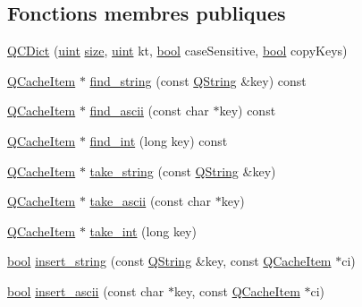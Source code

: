 \subsection*{Fonctions membres publiques}
\begin{DoxyCompactItemize}
\item 
\hyperlink{class_q_c_dict_a03e70e9f1509c03eb1fd08a8af904734}{Q\+C\+Dict} (\hyperlink{qglobal_8h_a4d3943ddea65db7163a58e6c7e8df95a}{uint} \hyperlink{class_q_g_dict_a1306e6fd44670f39bef97380ddadbe14}{size}, \hyperlink{qglobal_8h_a4d3943ddea65db7163a58e6c7e8df95a}{uint} kt, \hyperlink{qglobal_8h_a1062901a7428fdd9c7f180f5e01ea056}{bool} case\+Sensitive, \hyperlink{qglobal_8h_a1062901a7428fdd9c7f180f5e01ea056}{bool} copy\+Keys)
\item 
\hyperlink{struct_q_cache_item}{Q\+Cache\+Item} $\ast$ \hyperlink{class_q_c_dict_a321aef5383ff5e2c693dc99e2e6e430f}{find\+\_\+string} (const \hyperlink{class_q_string}{Q\+String} \&key) const 
\item 
\hyperlink{struct_q_cache_item}{Q\+Cache\+Item} $\ast$ \hyperlink{class_q_c_dict_a8fba04c10aff3eee9e14ee97aa5b0757}{find\+\_\+ascii} (const char $\ast$key) const 
\item 
\hyperlink{struct_q_cache_item}{Q\+Cache\+Item} $\ast$ \hyperlink{class_q_c_dict_a62aabeb819008e33c15a3f245809aa7e}{find\+\_\+int} (long key) const 
\item 
\hyperlink{struct_q_cache_item}{Q\+Cache\+Item} $\ast$ \hyperlink{class_q_c_dict_a7f08231ccc7351ca90acf4342e32217a}{take\+\_\+string} (const \hyperlink{class_q_string}{Q\+String} \&key)
\item 
\hyperlink{struct_q_cache_item}{Q\+Cache\+Item} $\ast$ \hyperlink{class_q_c_dict_a1f44b8f805674630a62ccf643cdec5df}{take\+\_\+ascii} (const char $\ast$key)
\item 
\hyperlink{struct_q_cache_item}{Q\+Cache\+Item} $\ast$ \hyperlink{class_q_c_dict_a320567bbbc800a59bdee4f69a356e942}{take\+\_\+int} (long key)
\item 
\hyperlink{qglobal_8h_a1062901a7428fdd9c7f180f5e01ea056}{bool} \hyperlink{class_q_c_dict_ae367e4d033e0f420364584dc64b1371a}{insert\+\_\+string} (const \hyperlink{class_q_string}{Q\+String} \&key, const \hyperlink{struct_q_cache_item}{Q\+Cache\+Item} $\ast$ci)
\item 
\hyperlink{qglobal_8h_a1062901a7428fdd9c7f180f5e01ea056}{bool} \hyperlink{class_q_c_dict_a70354f27a67f1330f3595f6e00e0812a}{insert\+\_\+ascii} (const char $\ast$key, const \hyperlink{struct_q_cache_item}{Q\+Cache\+Item} $\ast$ci)
\item 

\end{DoxyCompactItemize}
